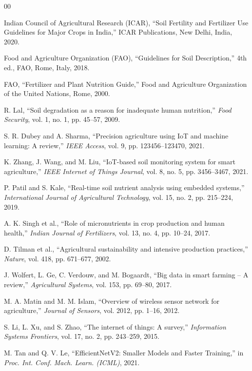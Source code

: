 \documentclass[conference]{IEEEtran}
\begin{document}
\begin{thebibliography}{00}

Indian Council of Agricultural Research (ICAR),
``Soil Fertility and Fertilizer Use Guidelines for Major Crops in India,''
ICAR Publications, New Delhi, India, 2020.

Food and Agriculture Organization (FAO),
``Guidelines for Soil Description,''
4th ed., FAO, Rome, Italy, 2018.

FAO,
``Fertilizer and Plant Nutrition Guide,''
Food and Agriculture Organization of the United Nations, Rome, 2000.

R. Lal,
``Soil degradation as a reason for inadequate human nutrition,''
\textit{Food Security}, vol. 1, no. 1, pp. 45--57, 2009.

S. R. Dubey and A. Sharma,
``Precision agriculture using IoT and machine learning: A review,''
\textit{IEEE Access}, vol. 9, pp. 123456--123470, 2021.

K. Zhang, J. Wang, and M. Liu,
``IoT-based soil monitoring system for smart agriculture,''
\textit{IEEE Internet of Things Journal}, vol. 8, no. 5, pp. 3456--3467, 2021.

P. Patil and S. Kale,
``Real-time soil nutrient analysis using embedded systems,''
\textit{International Journal of Agricultural Technology}, vol. 15, no. 2, pp. 215--224, 2019.

A. K. Singh et al.,
``Role of micronutrients in crop production and human health,''
\textit{Indian Journal of Fertilizers}, vol. 13, no. 4, pp. 10--24, 2017.

D. Tilman et al.,
``Agricultural sustainability and intensive production practices,''
\textit{Nature}, vol. 418, pp. 671--677, 2002.

J. Wolfert, L. Ge, C. Verdouw, and M. Bogaardt,
``Big data in smart farming -- A review,''
\textit{Agricultural Systems}, vol. 153, pp. 69--80, 2017.

M. A. Matin and M. M. Islam,
``Overview of wireless sensor network for agriculture,''
\textit{Journal of Sensors}, vol. 2012, pp. 1--16, 2012.

S. Li, L. Xu, and S. Zhao,
``The internet of things: A survey,''
\textit{Information Systems Frontiers}, vol. 17, no. 2, pp. 243--259, 2015.

M. Tan and Q. V. Le,
``EfficientNetV2: Smaller Models and Faster Training,''
in \textit{Proc. Int. Conf. Mach. Learn. (ICML)}, 2021.


\end{thebibliography}
\end{document}
